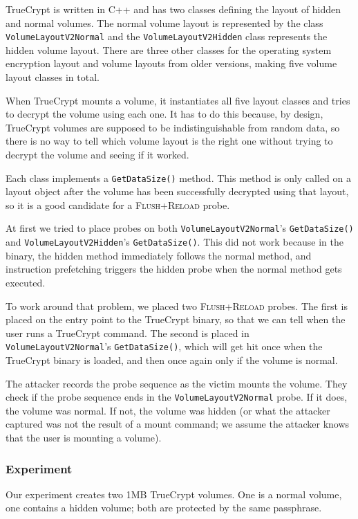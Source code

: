 \documentclass[letterpaper,twocolumn,10pt]{article}
\begin{document}
TrueCrypt is written in C++ and has two classes defining the layout of hidden
and normal volumes. The normal volume layout is represented by the class
\texttt{VolumeLayoutV2Normal} and the \texttt{VolumeLayoutV2Hidden} class
represents the hidden volume layout. There are three other classes for the
operating system encryption layout and volume layouts from older versions,
making five volume layout classes in total.

When TrueCrypt mounts a volume, it instantiates all five layout classes and
tries to decrypt the volume using each one. It has to do this because, by
design, TrueCrypt volumes are supposed to be indistinguishable from random data,
so there is no way to tell which volume layout is the right one without trying
to decrypt the volume and seeing if it worked.

Each class implements a \texttt{GetDataSize()} method. This method is only
called on a layout object after the volume has been successfully decrypted using
that layout, so it is a good candidate for a \textsc{Flush+Reload} probe.

At first we tried to place probes on both \texttt{VolumeLayoutV2Normal}'s
\texttt{GetDataSize()} and \texttt{VolumeLayoutV2Hidden}'s
\texttt{GetDataSize()}. This did not work because in the binary, the hidden
method immediately follows the normal method, and instruction prefetching
triggers the hidden probe when the normal method gets executed.

To work around that problem, we placed two \textsc{Flush+Reload} probes. The
first is placed on the entry point to the TrueCrypt binary, so that we can tell
when the user runs a TrueCrypt command. The second is placed in
\texttt{VolumeLayoutV2Normal}'s \texttt{GetDataSize()}, which will get hit once
when the TrueCrypt binary is loaded, and then once again only if the volume is
normal.

The attacker records the probe sequence as the victim mounts the volume. They
check if the probe sequence ends in the \texttt{VolumeLayoutV2Normal} probe. If
it does, the volume was normal. If not, the volume was hidden (or what the
attacker captured was not the result of a mount command; we assume the attacker
knows that the user is mounting a volume).

\subsubsection{Experiment}

Our experiment creates two 1MB TrueCrypt volumes. One is a normal volume, one
contains a hidden volume; both are protected by the same passphrase.
\end{document}

